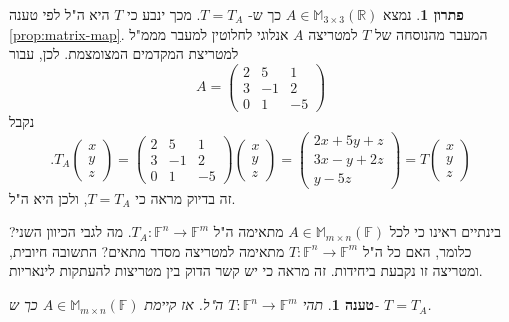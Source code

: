 \documentclass[12pt]{report}
\theoremstyle{plain}
\newtheorem{proposition}[theorem]{טענה}
\theoremstyle{definition}
\newtheorem*{solution}{פתרון}
\newcommand{\R}{\mathbb{R}}
\newcommand{\F}{\mathbb{F}}
\newcommand{\M}{\mathbb{M}}
\newcommand{\0}{\mathbf{0}}
\begin{document}
\begin{solution}
נמצא
$A\in\M_{3\times 3}(\R)$
כך ש-
$T=T_A$.
מכך ינבע כי 
$T$
היא ה"ל לפי טענה
\ref{prop:matrix-map}.
המעבר מהנוסחה של
$T$
למטריצה
$A$
אנלוגי לחלוטין למעבר מממ"ל למטריצת המקדמים המצומצמת. לכן, עבור
$$
A=\begin{pmatrix}
2 & 5 & 1\\
3 & -1 & 2\\
0 & 1 & -5
\end{pmatrix}
$$
נקבל
$$
.T_A\begin{pmatrix}x\\y\\z\end{pmatrix}=\begin{pmatrix}
2 & 5 & 1\\
3 & -1 & 2\\
0 & 1 & -5
\end{pmatrix}\begin{pmatrix}x\\y\\z\end{pmatrix}=\begin{pmatrix}2x+5y+z\\3x-y+2z\\y-5z\end{pmatrix}=T\begin{pmatrix}x\\y\\z\end{pmatrix}
$$
זה בדיוק מראה כי
$T=T_A$,
ולכן היא ה"ל.
\end{solution}

בינתיים ראינו כי לכל
$A\in\M_{m\times n}(\F)$
מתאימה ה"ל
$T_A:\F^n\to\F^m$.
מה לגבי הכיוון השני? כלומר, האם כל ה"ל
$T:\F^n\to\F^m$
מתאימה למטריצה מסדר מתאים? התשובה חיובית, ומטריצה זו נקבעת ביחידות. זה מראה כי יש קשר הדוק בין מטריצות להעתקות לינאריות.

\begin{proposition}\label{prop:unique-matrix}
תהי
$T:\F^n\to\F^m$
ה"ל. אז קיימת
$A\in\M_{m\times n}(\F)$
כך ש-
$T=T_A$.
\end{proposition}
\end{document}
